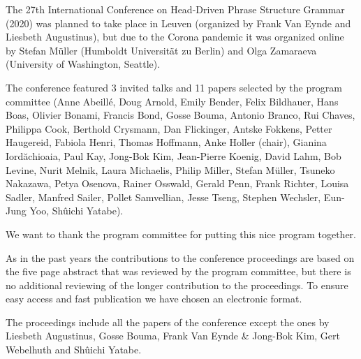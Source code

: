 The 27th International Conference on Head-Driven Phrase Structure Grammar (2020) was planned to take
place in Leuven (organized by Frank Van Eynde and Liesbeth Augustinus), but due to the Corona
pandemic it was organized online by Stefan Müller (Humboldt Universität zu Berlin) and Olga
Zamaraeva (University of Washington, Seattle).


The conference featured 3 invited talks and 11 papers selected by the program committee 
(Anne Abeillé, 
    Doug Arnold,
    Emily Bender,
    Felix Bildhauer,
    Hans Boas,
    Olivier Bonami,
    Francis Bond, 
    Gosse Bouma, 
    Antonio Branco, 
    Rui Chaves, 
    Philippa Cook, 
    Berthold Crysmann,
    Dan Flickinger, 
    Antske Fokkens, 
    Petter Haugereid, 
    Fabiola Henri, 
    Thomas Hoffmann, 
    Anke Holler (chair),
    Gianina Iordăchioaia,
    Paul Kay, 
    Jong-Bok Kim, 
    Jean-Pierre Koenig, 
    David Lahm, 
    Bob Levine, 
    Nurit Melnik, 
    Laura Michaelis, 
    Philip Miller, 
    Stefan Müller, 
    Tsuneko Nakazawa, 
    Petya Osenova, 
    Rainer Osswald, 
    Gerald Penn, 
    Frank Richter, 
    Louisa Sadler, 
    Manfred Sailer, 
    Pollet Samvellian, 
    Jesse Tseng, 
    Stephen Wechsler, 
    Eun-Jung Yoo, 
    Shûichi Yatabe).


We want to thank the program committee for putting this nice program together.

 

As in the past years the contributions to the conference proceedings are based on the five page abstract
that was reviewed by the %
program committee, but there is no additional reviewing of the
longer contribution to the proceedings. To ensure easy access and fast publication we have chosen an electronic format.

The proceedings include all the papers of the conference except the ones by Liesbeth Augustinus, Gosse Bouma, Frank Van
Eynde \& Jong-Bok Kim, Gert Webelhuth and Shûichi Yatabe.


